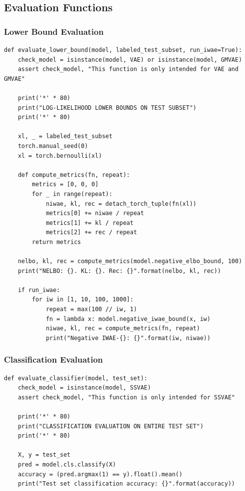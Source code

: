 \documentclass{article}
\begin{document}
\subsection{Evaluation Functions}

\subsubsection{Lower Bound Evaluation}

\begin{verbatim}
def evaluate_lower_bound(model, labeled_test_subset, run_iwae=True):
    check_model = isinstance(model, VAE) or isinstance(model, GMVAE)
    assert check_model, "This function is only intended for VAE and GMVAE"

    print('*' * 80)
    print("LOG-LIKELIHOOD LOWER BOUNDS ON TEST SUBSET")
    print('*' * 80)

    xl, _ = labeled_test_subset
    torch.manual_seed(0)
    xl = torch.bernoulli(xl)

    def compute_metrics(fn, repeat):
        metrics = [0, 0, 0]
        for _ in range(repeat):
            niwae, kl, rec = detach_torch_tuple(fn(xl))
            metrics[0] += niwae / repeat
            metrics[1] += kl / repeat
            metrics[2] += rec / repeat
        return metrics

    nelbo, kl, rec = compute_metrics(model.negative_elbo_bound, 100)
    print("NELBO: {}. KL: {}. Rec: {}".format(nelbo, kl, rec))

    if run_iwae:
        for iw in [1, 10, 100, 1000]:
            repeat = max(100 // iw, 1)
            fn = lambda x: model.negative_iwae_bound(x, iw)
            niwae, kl, rec = compute_metrics(fn, repeat)
            print("Negative IWAE-{}: {}".format(iw, niwae))
\end{verbatim}

\subsubsection{Classification Evaluation}

\begin{verbatim}
def evaluate_classifier(model, test_set):
    check_model = isinstance(model, SSVAE)
    assert check_model, "This function is only intended for SSVAE"

    print('*' * 80)
    print("CLASSIFICATION EVALUATION ON ENTIRE TEST SET")
    print('*' * 80)

    X, y = test_set
    pred = model.cls.classify(X)
    accuracy = (pred.argmax(1) == y).float().mean()
    print("Test set classification accuracy: {}".format(accuracy))
\end{verbatim}
\end{document}
